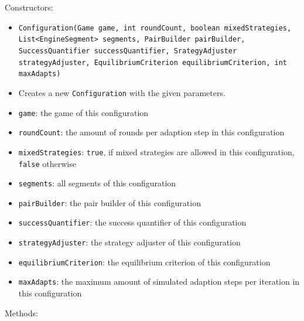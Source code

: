 \documentclass[parskip=full,11pt]{scrartcl}
\begin{document}
Constructors:
\begin{itemize}\itemsep -10pt
\item \texttt{Configuration(Game game, int roundCount, boolean mixedStrategies, List<EngineSegment> segments, PairBuilder pairBuilder, SuccessQuantifier successQuantifier, SrategyAdjuster strategyAdjuster, EquilibriumCriterion equilibriumCriterion, int maxAdapts)}
\item[] Creates a new \texttt{Configuration} with the given parameters.
\item[] \texttt{game}: the game of this configuration
\item[] \texttt{roundCount}: the amount of rounds per adaption step in this configuration
\item[] \texttt{mixedStrategies}: \texttt{true}, if mixed strategies are allowed in this configuration, \texttt{false} otherwise
\item[] \texttt{segments}: all segments of this configuration
\item[] \texttt{pairBuilder}: the pair builder of this configuration
\item[] \texttt{successQuantifier}: the success quantifier of this configuration
\item[] \texttt{strategyAdjuster}: the strategy adjuster of this configuration
\item[] \texttt{equilibriumCriterion}: the equilibrium criterion of this configuration
\item[] \texttt{maxAdapts}: the maximum amount of simulated adaption steps per iteration in this configuration
\end{itemize}
\newpage
Methods:
\end{document}
